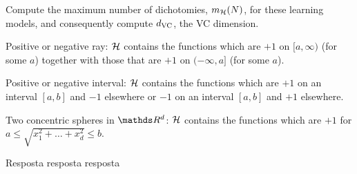 \begin{enunciado}{3}
    Compute the maximum number of dichotomies, $m_{\mathcal{H}}(N)$, for these
    learning models, and consequently compute $d_{\text{VC}}$, the VC dimension.
    
     Positive or negative ray: $\mathcal{H}$ contains the functions
    which are $+1$ on $[a, \infty)$ (for some $a$) together with those
    that are $+1$ on $(-\infty, a]$ (for some $a$).
    
     Positive or negative interval: $\mathcal{H}$ contains the functions which are $+1$ on an interval $[a, b]$ and $-1$ elsewhere or $-1$ on an interval $[a, b]$ and $+1$ elsewhere.
    
     Two concentric spheres in $\conjR^d$: $\mathcal{H}$ contains the
    functions which are $+1$ for $a \le \sqrt{x_1^2 + \dots + x_d^2} \le b$.
\end{enunciado}

Resposta resposta resposta